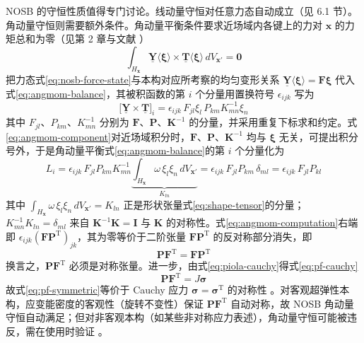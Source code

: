 NOSB 的守恒性质值得专门讨论。线动量守恒对任意力态自动成立（见 6.1 节）。角动量守恒则需要额外条件。角动量平衡条件要求近场域内各键上的力对 $\mathbf{x}$ 的力矩总和为零（见第 2 章与文献 \cite{SillingLehoucq2010}）
\begin{equation}
  \int_{H_{\mathbf{x}}}\underline{\mathbf{Y}}\langle\boldsymbol{\xi}\rangle\times\underline{\mathbf{T}}\langle\boldsymbol{\xi}\rangle\,dV_{\mathbf{x}'}=\mathbf{0}
  \label{eq:angmom-balance}
\end{equation}
把力态式\eqref{eq:nosb-force-state}与本构对应所考察的均匀变形关系 $\underline{\mathbf{Y}}\langle\boldsymbol{\xi}\rangle=\mathbf{F}\boldsymbol{\xi}$ 代入式\eqref{eq:angmom-balance}，其被积函数的第 $i$ 个分量用置换符号 $\epsilon_{ijk}$ 写为
\begin{equation}
  \bigl[\underline{\mathbf{Y}}\times\underline{\mathbf{T}}\bigr]_{i}
  =\epsilon_{ijk}\,F_{jl}\xi_{l}\,P_{km}K^{-1}_{mn}\xi_{n}
  \label{eq:angmom-component}
\end{equation}
其中 $F_{jl}$、$P_{km}$、$K^{-1}_{mn}$ 分别为 $\mathbf{F}$、$\mathbf{P}$、$\mathbf{K}^{-1}$ 的分量，并采用重复下标求和约定。式\eqref{eq:angmom-component}对近场域积分时，$\mathbf{F}$、$\mathbf{P}$、$\mathbf{K}^{-1}$ 均与 $\boldsymbol{\xi}$ 无关，可提出积分号外，于是角动量平衡式\eqref{eq:angmom-balance}的第 $i$ 个分量化为
\begin{equation}
  L_{i}=\epsilon_{ijk}\,F_{jl}P_{km}K^{-1}_{mn}
  \underbrace{\int_{H_{\mathbf{x}}}\omega\,\xi_{l}\xi_{n}\,dV_{\mathbf{x}'}}_{K_{ln}}
  =\epsilon_{ijk}\,F_{jl}P_{km}\,\delta_{ml}
  =\epsilon_{ijk}\,F_{jl}P_{kl}
  \label{eq:angmom-computation}
\end{equation}
其中 $\int_{H_{\mathbf{x}}}\omega\,\xi_{l}\xi_{n}\,dV_{\mathbf{x}'}=K_{ln}$ 正是形状张量式\eqref{eq:shape-tensor}的分量；$K^{-1}_{mn}K_{ln}=\delta_{ml}$ 来自 $\mathbf{K}^{-1}\mathbf{K}=\mathbf{I}$ 与 $\mathbf{K}$ 的对称性。式\eqref{eq:angmom-computation}右端即 $\epsilon_{ijk}(\mathbf{F}\mathbf{P}^{\mathrm{T}})_{jk}$，其为零等价于二阶张量 $\mathbf{F}\mathbf{P}^{\mathrm{T}}$ 的反对称部分消失，即
\begin{equation}
  \mathbf{P}\mathbf{F}^{\mathrm{T}}=\mathbf{F}\mathbf{P}^{\mathrm{T}}
  \label{eq:pf-symmetric}
\end{equation}
换言之，$\mathbf{P}\mathbf{F}^{\mathrm{T}}$ 必须是对称张量。进一步，由式\eqref{eq:piola-cauchy}得式\eqref{eq:pf-cauchy}
\begin{equation}
  \mathbf{P}\mathbf{F}^{\mathrm{T}}=J\boldsymbol{\sigma}
  \label{eq:pf-cauchy}
\end{equation}
故式\eqref{eq:pf-symmetric}等价于 Cauchy 应力 $\boldsymbol{\sigma}=\boldsymbol{\sigma}^{\mathrm{T}}$ 的对称性 \cite{TupekRadovitzky2014}。对客观超弹性本构，应变能密度的客观性（旋转不变性）保证 $\mathbf{P}\mathbf{F}^{\mathrm{T}}$ 自动对称，故 NOSB 角动量守恒自动满足；但对非客观本构（如某些非对称应力表述），角动量守恒可能被违反，需在使用时验证 \cite{Silling2007,TupekRadovitzky2014}。

